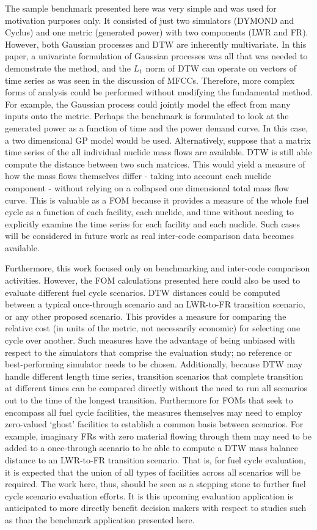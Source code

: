 The sample benchmark presented here was very simple and was used for motivation 
purposes only. It consisted of just
two simulators (DYMOND and Cyclus) and one metric (generated power) with
two components (LWR and FR).  However, both Gaussian processes and DTW
are inherently multivariate. In this paper, a univariate formulation of 
Gaussian processes was all that was needed to demonstrate the method, and 
the $L_1$ norm of DTW can operate on vectors of time series as was seen 
in the discussion of MFCCs. Therefore, more complex forms of analysis could 
be performed without modifying the fundamental method. For example, the Gaussian process could jointly model the 
effect from many inputs onto the metric. Perhaps the benchmark is formulated
to look at the generated power as a function of time and the power demand curve.
In this case, a two dimensional GP model would be used. Alternatively, 
suppose that a matrix time series of the all individual nuclide mass flows 
are available. DTW is still able compute the distance between two 
such matrices. This would yield a measure of how the mass flows themselves
differ - taking into account each nuclide component - without relying on a 
collapsed one dimensional total mass flow curve. 
This is valuable as a FOM because it provides a measure of the whole fuel
cycle as a function of each facility, each nuclide, and time 
without needing to explicitly examine the time series for each facility 
and each nuclide.
Such cases will be considered in
future work as real inter-code comparison data becomes available.

Furthermore, this work focused only on benchmarking and inter-code comparison
activities.
However, the FOM calculations presented here could also be used to evaluate 
different fuel cycle scenarios. DTW distances could be computed between
a typical once-through scenario and an LWR-to-FR transition
scenario, or any other proposed scenario. This provides a measure for 
comparing the relative cost (in units of the metric, not necessarily 
economic) for selecting one cycle over another. 
Such measures have the advantage of being unbiased with respect to the 
simulators that comprise the evaluation study; no reference or best-performing
simulator needs to be chosen. 
Additionally, because DTW may handle different length time series, 
transition scenarios that complete transition at different times can be 
compared directly without the need to run all scenarios out to the time of 
the longest transition.
Furthermore for FOMs that seek to encompass all fuel cycle facilities,
the measures themselves may need to employ zero-valued `ghost' 
facilities to establish a common basis between scenarios.  For example, 
imaginary FRs with zero material flowing through them may need to be added 
to a once-through scenario to be able to compute a DTW mass balance distance 
to an LWR-to-FR transition scenario. That is, for fuel cycle evaluation,
it is expected that the union of all types of facilities across all scenarios 
will be required.
The work here, thus, 
should be seen as a stepping stone to further fuel cycle scenario evaluation
efforts. It is this upcoming evaluation application is anticipated to more 
directly benefit decision makers with respect to studies such as 
\cite{wigeland2014nuclear} than the benchmark application presented here.
